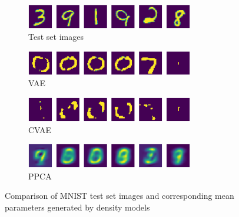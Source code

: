 \begin{figure}[H]
	\begin{subfigure}[t]{1\textwidth}
		\centering
		\includegraphics[width = 0.8\textwidth]{figures/ppca/real}
		\caption{Test set images}
		\label{fig:ppca:real}
	\end{subfigure}
	\begin{subfigure}[t]{1\textwidth}
		\centering
		\includegraphics[width = 0.8\textwidth]{figures/vae/mean}
		\caption{VAE}
		\label{fig:ppca:mean}
	\end{subfigure}
	\begin{subfigure}[t]{1\textwidth}
		\centering
		\includegraphics[width = 0.8\textwidth]{figures/cvae/mean}
		\caption{CVAE}
		\label{fig:ppca:sample}
	\end{subfigure}
	\begin{subfigure}[t]{1\textwidth}
		\centering
		\includegraphics[width = 0.8\textwidth]{figures/ppca/mean}
		\caption{PPCA}
		\label{fig:ppca:sample}
	\end{subfigure}
	\caption{Comparison of MNIST test set images and corresponding mean parameters generated by density models}
	\label{fig:mean:_v_real}
\end{figure}


